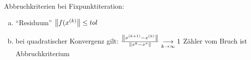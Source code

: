 Abbruchkriterien bei Fixpunktiteration:
\begin{enumerate}[a)]
  \item ``Residuum'' $\left\lVert f(x^{(k)} \right\rVert \leq tol$
  \item bei quadratischer Konvergenz gilt: $\frac{\left\lVert x^{(k+1)} - x^{(k)} \right\rVert}{\left\lVert x^k - x^* \right\rVert} \underset{k \rightarrow \infty}{\longrightarrow} 1$
    Zähler vom Bruch ist Abbruchkriterium
\end{enumerate}

